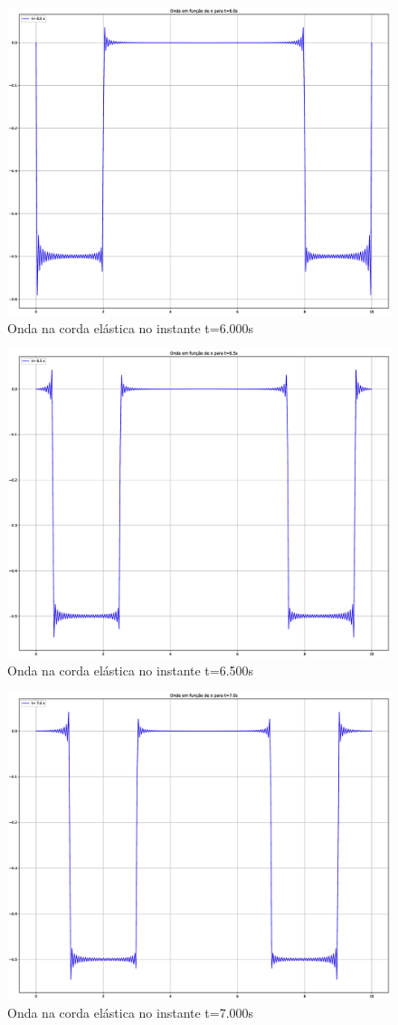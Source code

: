\documentclass[12pt, a4paper, portuguese]{fphw}
\begin{document}
\begin{figure}[H]
	\centering
	\includegraphics[width=.8\linewidth]{"graficos/grafico_t=6.000s"}
	\caption{Onda na corda elástica no instante t=6.000s}
	\label{fig:grafico-t6}
\end{figure}

\begin{figure}[H]
	\centering
	\includegraphics[width=.8\linewidth]{"graficos/grafico_t=6.500s"}
	\caption{Onda na corda elástica no instante t=6.500s}
	\label{fig:grafico-t6.5}
\end{figure}

\begin{figure}[H]
	\centering
	\includegraphics[width=.8\linewidth]{"graficos/grafico_t=7.000s"}
	\caption{Onda na corda elástica no instante t=7.000s}
	\label{fig:grafico-t7}
\end{figure}
\end{document}
